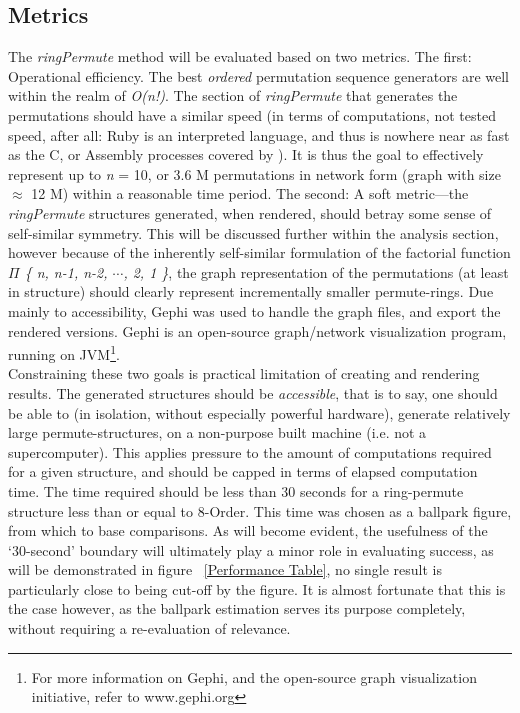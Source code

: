 \documentclass[12pt]{article}
\begin{document}
\pagebreak[2]

\subsection{Metrics}
The \emph{ringPermute} method will be evaluated based on two metrics.
The first: Operational efficiency. The best \emph{ordered} permutation sequence generators are well within the realm of \emph{O(n!)}.
The section of \emph{ringPermute} that generates the permutations should have a similar speed (in terms of computations, not tested speed, after all: Ruby is an interpreted language, and thus is nowhere near as fast as the C, or Assembly processes covered by \cite{Sedgewick:1977}).
It is thus the goal to effectively represent up to \emph{n} = 10, or 3.6 M permutations in network form (graph with size $\approx$ 12 M) within a reasonable time period.
The second: A soft metric---the \emph{ringPermute} structures generated, when rendered, should betray some sense of self-similar symmetry.
This will be discussed further within the analysis section, however because of the inherently self-similar formulation of the factorial function \emph{ $\Pi$ \{ n, n-1, n-2, $\cdots$, 2, 1 \}}, the graph representation of the permutations (at least in structure) should clearly represent incrementally smaller permute-rings.
Due mainly to accessibility, Gephi was used to handle the graph files, and export the rendered versions. \linebreak[0] Gephi is an open-source graph/network visualization program, running on JVM\footnote{For more information on Gephi, and the open-source graph visualization initiative, refer to www.gephi.org}.\\

Constraining these two goals is practical limitation of creating and rendering results.
The generated structures should be \emph{accessible}, that is to say, one should be able to (in isolation, without especially powerful hardware), generate relatively large permute-structures, on a non-purpose built machine (i.e. not a supercomputer).
This applies pressure to the amount of computations required for a given structure, and should be capped in terms of elapsed computation time.
The time required should be less than 30 seconds for a ring-permute structure less than or equal to 8-Order.
This time was chosen as a ballpark figure, from which to base comparisons.
As will become evident, the usefulness of the `30-second' boundary will ultimately play a minor role in evaluating success, as will be demonstrated in figure ~\ref{Performance Table}, no single result is particularly close to being cut-off by the figure.
It is almost fortunate that this is the case however, as the ballpark estimation serves its purpose completely, without requiring a re-evaluation of relevance.\\
\end{document}
